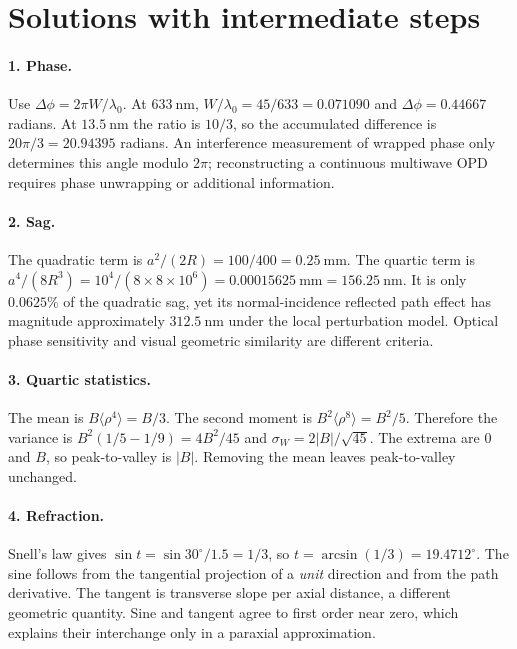 \section{Solutions with intermediate steps}
\paragraph{1. Phase.}
Use $\Delta\phi=2\pi W/\lambda_0$. At $633\ \mathrm{nm}$, $W/\lambda_0=45/633=0.071090$ and $\Delta\phi=0.44667$ radians. At $13.5\ \mathrm{nm}$ the ratio is $10/3$, so the accumulated difference is $20\pi/3=20.94395$ radians. An interference measurement of wrapped phase only determines this angle modulo $2\pi$; reconstructing a continuous multiwave OPD requires phase unwrapping or additional information.

\paragraph{2. Sag.}
The quadratic term is $a^2/(2R)=100/400=0.25\ \mathrm{mm}$. The quartic term is $a^4/(8R^3)=10^4/(8\times8\times10^6)=0.00015625\ \mathrm{mm}=156.25\ \mathrm{nm}$. It is only $0.0625\%$ of the quadratic sag, yet its normal-incidence reflected path effect has magnitude approximately $312.5\ \mathrm{nm}$ under the local perturbation model. Optical phase sensitivity and visual geometric similarity are different criteria.

\paragraph{3. Quartic statistics.}
The mean is $B\langle\rho^4\rangle=B/3$. The second moment is $B^2\langle\rho^8\rangle=B^2/5$. Therefore the variance is $B^2(1/5-1/9)=4B^2/45$ and $\sigma_W=2|B|/\sqrt{45}$. The extrema are $0$ and $B$, so peak-to-valley is $|B|$. Removing the mean leaves peak-to-valley unchanged.

\paragraph{4. Refraction.}
Snell's law gives $\sin t=\sin30^\circ/1.5=1/3$, so $t=\arcsin(1/3)=19.4712^\circ$. The sine follows from the tangential projection of a \emph{unit} direction and from the path derivative. The tangent is transverse slope per axial distance, a different geometric quantity. Sine and tangent agree to first order near zero, which explains their interchange only in a paraxial approximation.

